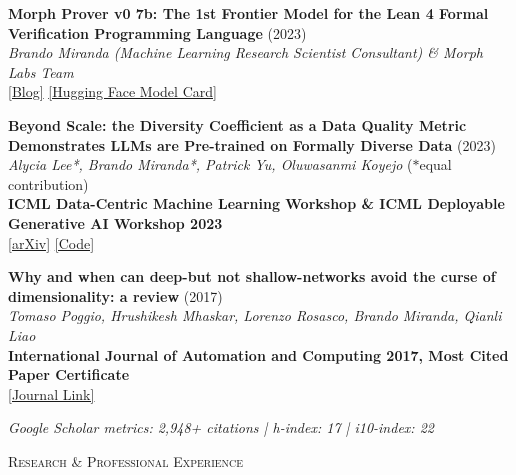 \documentclass{article}
\newenvironment{changemargin}[2]{%
  \begin{list}{}{%
    \setlength{\topsep}{0pt}%
    \setlength{\leftmargin}{#1}%
    \setlength{\rightmargin}{#2}%
    \setlength{\listparindent}{\parindent}%
    \setlength{\itemindent}{\parindent}%
    \setlength{\parsep}{\parskip}%
  }%
  \item[]}{\end{list}
}
\newcommand{\lineover}{
	\begin{changemargin}{-0.05in}{-0.05in}
		\vspace*{-8pt}
		\hrulefill \\
		\vspace*{-2pt}
	\end{changemargin}
}
\newcommand{\header}[1]{
	\begin{changemargin}{-0.5in}{-0.5in}
		\scshape{#1}\\
  	\lineover
	\end{changemargin}
}
\newenvironment{body} {
	\vspace*{-16pt}
	\begin{changemargin}{-0.25in}{-0.5in}
  }	
	{\end{changemargin}
}
\begin{document}
\begin{body}
    \vspace{10pt}
    \textbf{Morph Prover v0 7b: The 1st Frontier Model for the Lean 4 Formal Verification Programming Language} (2023)\\
    \emph{Brando Miranda (Machine Learning Research Scientist Consultant) \& Morph Labs Team}\\
    \href{https://morph.so/blog/the-personal-ai-proof-engineer/}{[Blog]} \href{https://huggingface.co/morph-labs/morph-prover-v0-7b}{[Hugging Face Model Card]}
    
    \vspace{10pt}
    \textbf{Beyond Scale: the Diversity Coefficient as a Data Quality Metric Demonstrates LLMs are Pre-trained on Formally Diverse Data} (2023)\\
    \emph{Alycia Lee*, Brando Miranda*, Patrick Yu, Oluwasanmi Koyejo} ($*$equal contribution)\\
    \textbf{ICML Data-Centric Machine Learning Workshop \& ICML Deployable Generative AI Workshop 2023}\\
    \href{https://arxiv.org/abs/2306.13840}{[arXiv]} \href{https://github.com/alycialee/beyond-scale-language-data-diversity}{[Code]}
    
    \vspace{10pt}
    \textbf{Why and when can deep-but not shallow-networks avoid the curse of dimensionality: a review} (2017)\\
    \emph{Tomaso Poggio, Hrushikesh Mhaskar, Lorenzo Rosasco, Brando Miranda, Qianli Liao}\\
    \textbf{International Journal of Automation and Computing 2017, Most Cited Paper Certificate}\\
    \href{https://link.springer.com/article/10.1007/s11633-017-1054-2}{[Journal Link]}
    
    \vspace{8pt}
    \emph{Google Scholar metrics: 2,948+ citations | h-index: 17 | i10-index: 22}
\end{body}

\newpage

\header{Research \& Professional Experience}
\end{document}
